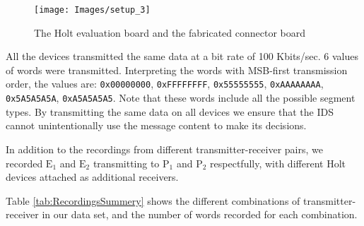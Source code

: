\documentclass[english]{llncs}
\begin{document}
  \begin{figure}[t]
    \centering
    \texttt{[image: Images/setup\_3]}
    \caption{The Holt evaluation board and the fabricated connector board}
    \label{fig:SetupImage}
  \end{figure}
  
  All the devices transmitted the same data at a bit rate of 100 Kbits/sec. 6 values of words were transmitted. Interpreting the words with MSB-first transmission order, the values are: \texttt{0x00000000}, \texttt{0xFFFFFFFF}, \texttt{0x55555555}, \texttt{0xAAAAAAAA}, \texttt{0x5A5A5A5A}, \texttt{0xA5A5A5A5}. Note that these words include all the possible segment types. By transmitting the same data on all devices we ensure that
  the IDS cannot unintentionally use the message content to make its decisions.
  
  In addition to the recordings from different transmitter-receiver pairs, we recorded \(\text{E}_1\) and \(\text{E}_2\) transmitting to \(\text{P}_1\) and \(\text{P}_2\) respectfully, with different Holt devices attached as additional receivers.
  
  Table \ref{tab:RecordingsSummery} shows the different combinations of transmitter-receiver in our data set, and the number of words recorded for each combination.
\end{document}
